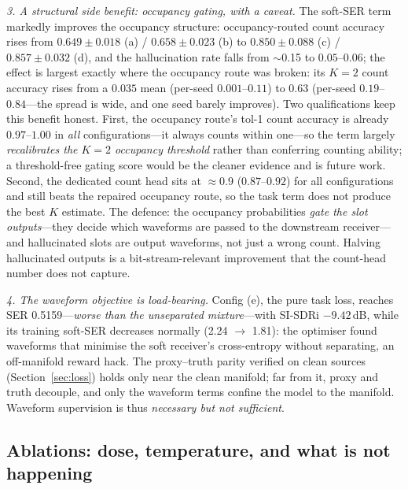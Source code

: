 \documentclass[review,12pt]{elsarticle}
\begin{document}
\emph{3. A structural side benefit: occupancy gating, with a caveat.}
The soft-SER term markedly improves the occupancy structure:
occupancy-routed count accuracy rises from $0.649 \pm 0.018$ (a) /
$0.658 \pm 0.023$ (b) to $0.850 \pm 0.088$ (c) / $0.857 \pm 0.032$ (d),
and the hallucination rate falls from $\sim$0.15 to $0.05$--$0.06$; the
effect is largest exactly where the occupancy route was broken: its
$K{=}2$ count accuracy rises from a $0.035$ mean (per-seed
$0.001$--$0.11$) to $0.63$ (per-seed $0.19$--$0.84$---the spread is
wide, and one seed barely improves). Two qualifications keep this
benefit honest. First, the occupancy route's tol-1 count accuracy is
already $0.97$--$1.00$ in \emph{all} configurations---it always counts
within one---so the term largely \emph{recalibrates the $K{=}2$
occupancy threshold} rather than conferring counting ability; a
threshold-free gating score would be the cleaner evidence and is future
work. Second, the dedicated count head sits at $\approx$0.9
($0.87$--$0.92$) for all
configurations and still beats the repaired occupancy route, so the
task term does not produce the best $K$ estimate. The defence: the
occupancy probabilities \emph{gate the slot outputs}---they decide
which waveforms are passed to the downstream receiver---and
hallucinated slots are output waveforms, not just a wrong count.
Halving hallucinated outputs is a bit-stream-relevant improvement that
the count-head number does not capture.

\emph{4. The waveform objective is load-bearing.} Config (e), the pure
task loss, reaches SER 0.5159---\emph{worse than the unseparated
mixture}---with SI-SDRi $-9.42$\,dB, while its training soft-SER
decreases normally (2.24 $\to$ 1.81): the optimiser found waveforms
that minimise the soft receiver's cross-entropy without separating, an
off-manifold reward hack. The proxy--truth parity verified on clean
sources (Section~\ref{sec:loss}) holds only near the clean manifold;
far from it, proxy and truth decouple, and only the waveform terms
confine the model to the manifold. Waveform supervision is thus
\emph{necessary but not sufficient}.

\subsection{Ablations: dose, temperature, and what is not happening}
\label{sec:abl}
\end{document}
